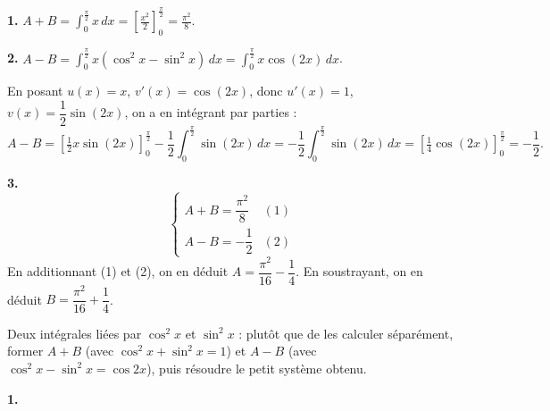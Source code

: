 \documentclass[11pt]{article}
\begin{document}


\textbf{1.} $\displaystyle A + B = \int_0^{\frac{\pi}{2}} x\,dx = \left[\frac{x^2}{2}\right]_0^{\frac{\pi}{2}} = \frac{\pi^2}{8}$.

\textbf{2.} $\displaystyle A - B = \int_0^{\frac{\pi}{2}} x(\cos^2 x - \sin^2 x)\,dx = \int_0^{\frac{\pi}{2}} x\cos(2x)\,dx$.

En posant $u(x) = x$, $v'(x) = \cos(2x)$, donc $u'(x) = 1$, $v(x) = \dfrac{1}{2}\sin(2x)$, on a en intégrant par parties :
\[ A - B = \left[\tfrac{1}{2}x\sin(2x)\right]_0^{\frac{\pi}{2}} - \frac{1}{2}\int_0^{\frac{\pi}{2}}\sin(2x)\,dx = -\frac{1}{2}\int_0^{\frac{\pi}{2}}\sin(2x)\,dx = \left[\tfrac{1}{4}\cos(2x)\right]_0^{\frac{\pi}{2}} = -\frac{1}{2}. \]

\textbf{3.}
\[ \begin{cases} A + B = \dfrac{\pi^2}{8} & (1) \\[1ex] A - B = -\dfrac{1}{2} & (2) \end{cases} \]
En additionnant (1) et (2), on en déduit $A = \dfrac{\pi^2}{16} - \dfrac{1}{4}$. En soustrayant, on en déduit $B = \dfrac{\pi^2}{16} + \dfrac{1}{4}$.

\begin{methode}
Deux intégrales liées par $\cos^2 x$ et $\sin^2 x$ : plutôt que de les
calculer séparément, former $A + B$ (avec $\cos^2 x + \sin^2 x = 1$) et
$A - B$ (avec $\cos^2 x - \sin^2 x = \cos 2x$), puis résoudre le petit
système obtenu.
\end{methode}


\textbf{1.} \begin{center}
\end{center}
\end{document}
